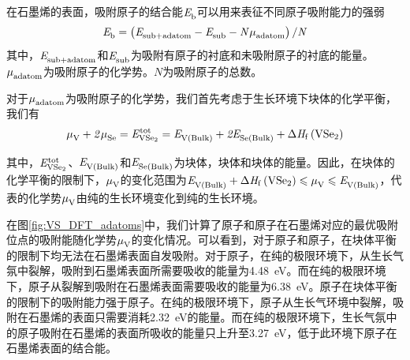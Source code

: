     在石墨烯的表面，吸附原子的结合能$\it E_{\rm b}^{\rm } \it$可以用来表征不同原子吸附能力的强弱\chinesecolon
    \[
        \it E_{\rm b}^{\rm } \it=\left(\it E_{\rm sub+adatom}^{\rm } \it-\it E_{\rm sub}^{\rm } \it-N\it \mu_{\rm adatom}^{\rm } \it\right)/ N
    \]
    其中，$\it E_{\rm sub+adatom}^{\rm } \it$和$\it E_{\rm sub}^{\rm } \it$为吸附有原子的衬底和未吸附原子的衬底的能量。$\it \mu_{\rm adatom}^{\rm } \it$为吸附原子的化学势。$N$为吸附原子的总数。

    对于$\it \mu_{\rm adatom}^{\rm } \it$为吸附原子的化学势，我们首先考虑于生长环境下块体的化学平衡，我们有\chinesecolon
    \begin{equation}
        \label{eq:VS_bulkEqmb}
        \muVar{V}{}+2\muVar{Se}{}=\energyVar{\ce{VSe2}}{tot}=\energyVar{V\left(Bulk\right)}{}+2\energyVar{Se\left(Bulk\right)}{}+\rm{\Delta} \it H_{\rm f}\left(\ce{VSe2}\right)
    \end{equation}

    其中，$\energyVar{\ce{VSe2}}{tot}$、$\it E_{\rm V\left(Bulk\right)}^{\rm } \it$和$\it E_{\rm Se\left(Bulk\right)}^{\rm } \it$为块体，块体和块体的能量。因此，在块体的化学平衡的限制下，$\it \mu_{\rm V}^{\rm } \it$的变化范围为$\energyVar{V\left(Bulk\right)}{}+\rm{\Delta} \it H_{\rm f}\left(\ce{VSe2}\right) \leqslant \muVar{V}{}  \leqslant \energyVar{V\left(Bulk\right)}{}$，代表的化学势$\it \mu_{\rm V}^{\rm } \it$由纯的生长环境变化到纯的生长环境。

    在图\ref{fig:VS_DFT_adatoms}中，我们计算了原子和原子在石墨烯对应的最优吸附位点的吸附能随化学势$\it \mu_{\rm V}^{\rm } \it$的变化情况。可以看到，对于原子和原子，在块体平衡的限制下均无法在石墨烯表面自发吸附。对于原子，在纯的极限环境下，从生长气氛中裂解，吸附到石墨烯表面所需要吸收的能量为\SI{4.48}{\electronvolt}。而在纯的极限环境下，原子从裂解到吸附在石墨烯表面需要吸收的能量为\SI{6.38}{\electronvolt}。原子在块体平衡的限制下的吸附能力强于原子。在纯的极限环境下，原子从生长气环境中裂解，吸附在石墨烯的表面只需要消耗\SI{2.32}{\electronvolt}的能量。而在纯的极限环境下，生长气氛中的原子吸附在石墨烯的表面所吸收的能量只上升至\SI{3.27}{\electronvolt}，低于此环境下原子在石墨烯表面的结合能。


